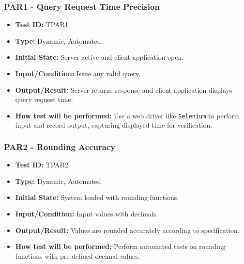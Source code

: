 \documentclass[12pt, titlepage]{article}
\begin{document}
\subsubsection{PAR1 - Query Request Time Precision}
\begin{itemize}
    \item \textbf{Test ID:} TPAR1
    \item \textbf{Type:} Dynamic, Automated
    \item \textbf{Initial State:} Server active and client application open.
    \item \textbf{Input/Condition:} Issue any valid query.
    \item \textbf{Output/Result:} Server returns response and client application displays query request time.
    \item \textbf{How test will be performed:} Use a web driver like \texttt{Selenium} to perform input and record output, capturing displayed time for verification.
\end{itemize}

\subsubsection{PAR2 - Rounding Accuracy}
\begin{itemize}
    \item \textbf{Test ID:} TPAR2
    \item \textbf{Type:} Dynamic, Automated
    \item \textbf{Initial State:} System loaded with rounding functions.
    \item \textbf{Input/Condition:} Input values with decimals.
    \item \textbf{Output/Result:} Values are rounded accurately according to specification.
    \item \textbf{How test will be performed:} Perform automated tests on rounding functions with pre-defined decimal values.
\end{itemize}
\end{document}
